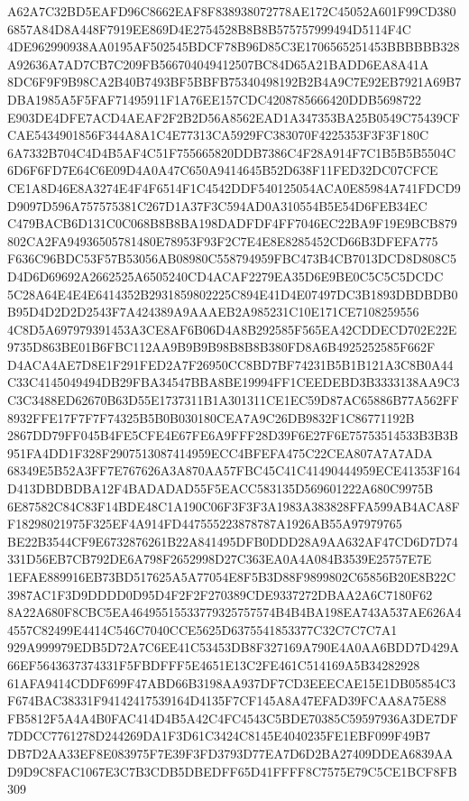 \documentclass[UTF8,fontset=fandol,zihao=-4,a4paper]{ctexart}
\begin{document}
{{A62A7C32BD5EAFD96C8662EAF8F838938072778AE172C45052A601F99CD3806857A84D8A448F7919EE869D4E2754528B8B8B575757999494D5114F4C
4DE962990938AA0195AF502545BDCF78B96D85C3E1706565251453BBBBBB328A92636A7AD7CB7C209FB566704049412507BC84D65A21BADD6EA8A41A
8DC6F9F9B98CA2B40B7493BF5BBFB75340498192B2B4A9C7E92EB7921A69B7DBA1985A5F5FAF71495911F1A76EE157CDC4208785666420DDB5698722
E903DE4DFE7ACD4AEAF2F2B2D56A8562EAD1A347353BA25B0549C75439CFCAE5434901856F344A8A1C4E77313CA5929FC383070F4225353F3F3F180C
6A7332B704C4D4B5AF4C51F755665820DDB7386C4F28A914F7C1B5B5B5504C6D6F6FD7E64C6E09D4A0A47C650A9414645B52D638F11FED32DC07CFCE
CE1A8D46E8A3274E4F4F6514F1C4542DDF540125054ACA0E85984A741FDCD9D9097D596A757575381C267D1A37F3C594AD0A310554B5E54D6FEB34EC
C479BACB6D131C0C068B8B8BA198DADFDF4FF7046EC22BA9F19E9BCB879802CA2FA94936505781480E78953F93F2C7E4E8E8285452CD66B3DFEFA775
F636C96BDC53F57B53056AB08980C558794959FBC473B4CB7013DCD8D808C5D4D6D69692A2662525A6505240CD4ACAF2279EA35D6E9BE0C5C5C5DCDC
5C28A64E4E4E6414352B2931859802225C894E41D4E07497DC3B1893DBDBDB0B95D4D2D2D2543F7A424389A9AAAEB2A985231C10E171CE7108259556
4C8D5A697979391453A3CE8AF6B06D4A8B292585F565EA42CDDECD702E22E9735D863BE01B6FBC112AA9B9B9B98B8B8B380FD8A6B4925252585F662F
D4ACA4AE7D8E1F291FED2A7F26950CC8BD7BF74231B5B1B121A3C8B0A44C33C4145049494DB29FBA34547BBA8BE19994FF1CEEDEBD3B3333138AA9C3
C3C3488ED62670B63D55E1737311B1A301311CE1EC59D87AC65886B77A562FF8932FFE17F7F7F74325B5B0B030180CEA7A9C26DB9832F1C86771192B
2867DD79FF045B4FE5CFE4E67FE6A9FFF28D39F6E27F6E75753514533B3B3B951FA4DD1F328F2907513087414959ECC4BFEFA475C22CEA807A7A7ADA
68349E5B52A3FF7E767626A3A870AA57FBC45C41C41490444959ECE41353F164D413DBDBDBA12F4BADADAD55F5EACC583135D569601222A680C9975B
6E87582C84C83F14BDE48C1A190C06F3F3F3A1983A383828FFA599AB4ACA8FF18298021975F325EF4A914FD447555223878787A1926AB55A97979765
BE22B3544CF9E6732876261B22A841495DFB0DDD28A9AA632AF47CD6D7D74331D56EB7CB792DE6A798F2652998D27C363EA0A4A084B3539E25757E7E
1EFAE889916EB73BD517625A5A77054E8F5B3D88F9899802C65856B20E8B22C3987AC1F3D9DDDD0D95D4F2F2F270389CDE9337272DBAA2A6C7180F62
8A22A680F8CBC5EA46495515533779325757574B4B4BA198EA743A537AE626A44557C82499E4414C546C7040CCE5625D6375541853377C32C7C7C7A1
929A999979EDB5D72A7C6EE41C53453DB8F327169A790E4A0AA6BDD7D429A66EF5643637374331F5FBDFFF5E4651E13C2FE461C514169A5B34282928
61AFA9414CDDF699F47ABD66B3198AA937DF7CD3EEECAE15E1DB05854C3F674BAC38331F94142417539164D4135F7CF145A8A47EFAD39FCAA8A75E88
FB5812F5A4A4B0FAC414D4B5A42C4FC4543C5BDE70385C59597936A3DE7DF7DDCC7761278D244269DA1F3D61C3424C8145E4040235FE1EBF099F49B7
DB7D2AA33EF8E083975F7E39F3FD3793D77EA7D6D2BA27409DDEA6839AAD9D9C8FAC1067E3C7B3CDB5DBEDFF65D41FFFF8C7575E79C5CE1BCF8FB309
}}
\end{document}
